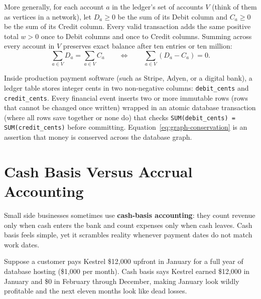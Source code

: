 More generally, for each account $a$ in the ledger's set of accounts $V$ (think of them as vertices in a network), let $D_a \ge 0$ be the sum of its Debit column and $C_a \ge 0$ be the sum of its Credit column. Every valid transaction adds the same positive total $w > 0$ once to Debit columns and once to Credit columns. Summing across every account in $V$ preserves exact balance after ten entries or ten million:
\begin{equation}
  \label{eq:graph-conservation}
  \sum_{a \in V} D_a = \sum_{a \in V} C_a
  \qquad\Longleftrightarrow\qquad
  \sum_{a \in V} (D_a - C_a) = 0.
\end{equation}

\begin{happeningbox}
Inside production payment software (such as Stripe, Adyen, or a digital bank), a ledger table stores integer cents in two non-negative columns: \texttt{debit\_cents} and \texttt{credit\_cents}. Every financial event inserts two or more immutable rows (rows that cannot be changed once written) wrapped in an atomic database transaction (where all rows save together or none do) that checks \texttt{SUM(debit\_cents) = SUM(credit\_cents)} before committing. Equation~\eqref{eq:graph-conservation} is an assertion that money is conserved across the database graph.
\end{happeningbox}

\section{Cash Basis Versus Accrual Accounting}

Small side businesses sometimes use \textbf{cash-basis accounting}: they count revenue only when cash enters the bank and count expenses only when cash leaves. Cash basis feels simple, yet it scrambles reality whenever payment dates do not match work dates.

Suppose a customer pays Kestrel \$12,000 upfront in January for a full year of database hosting (\$1,000 per month). Cash basis says Kestrel earned \$12,000 in January and \$0 in February through December, making January look wildly profitable and the next eleven months look like dead losses.

